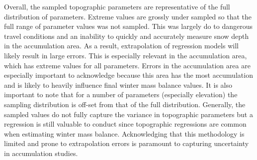 \documentclass[12pt]{article}
\begin{document}
Overall, the sampled topographic parameters are representative of the full distribution of parameters. Extreme values are grossly under sampled so that the full range of parameter values was not sampled. This was largely do to dangerous travel conditions and an inability to quickly and accurately measure snow depth in the accumulation area. As a result, extrapolation of regression models will likely result in large errors. This is especially relevant in the accumulation area, which has extreme values for all parameters. Errors in the accumulation area are especially important to acknowledge because this area has the most accumulation and is likely to heavily influence final winter mass balance values. It is also important to note that for a number of parameters (especially elevation) the sampling distribution is off-set from that of the full distribution. Generally, the sampled values do not fully capture the variance in topographic parameters but a regression is still valuable to conduct since topographic regressions are common when estimating winter mass balance. Acknowledging that this methodology is limited and prone to extrapolation errors is paramount to capturing uncertainty in accumulation studies. 
\end{document}
